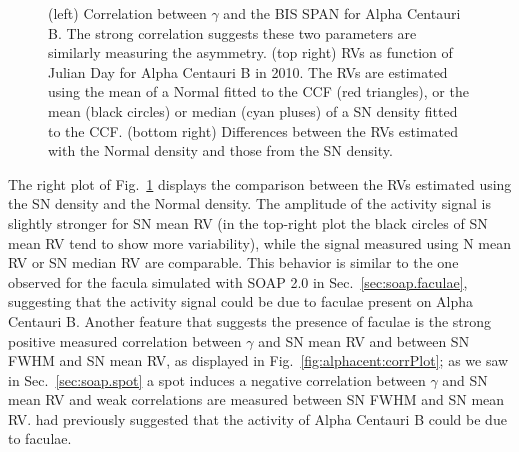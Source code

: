 \documentclass{aa}
\begin{document}
\begin{figure}[htbp]
\begin{center}
   \caption{(left) Correlation between $\gamma$ and the BIS SPAN for Alpha Centauri B. The strong correlation suggests these two parameters are similarly measuring the asymmetry. (top right) RVs as function of Julian Day for Alpha Centauri B in 2010. The RVs are estimated using the mean of a Normal fitted to the CCF (red triangles), or the mean (black circles) or median (cyan pluses) of a SN density fitted to the CCF. (bottom right) Differences between the RVs estimated with the Normal density and those from the SN density.}
   \label{fig:alphacent:corr.gamma}
\end{center}
\end{figure}
%

The right plot of Fig.~\ref{fig:alphacent:corr.gamma} displays the comparison between the RVs estimated using the SN density and the Normal density. 
The amplitude of the activity signal is slightly stronger for SN mean RV (in the top-right plot the black circles of SN mean RV tend to show more variability), while the signal measured using N mean RV or SN median RV are comparable. 
%
This behavior is similar to the one observed for the facula simulated with SOAP 2.0 in Sec.~\ref{sec:soap.faculae}, suggesting that the activity signal could be due to faculae present on Alpha Centauri B.  
%
Another feature that suggests the presence of faculae is the strong positive measured correlation between $\gamma$ and SN mean RV and  between SN FWHM and SN mean RV, as displayed in Fig.~\ref{fig:alphacent:corrPlot}; 
as we saw in Sec.~\ref{sec:soap.spot} a spot induces a negative correlation between $\gamma$ and SN mean RV and weak correlations are measured between SN FWHM and SN mean RV.
\citet{Dumusque-2014c} had previously suggested that the activity of Alpha Centauri B could be due to faculae.
%
\end{document}
